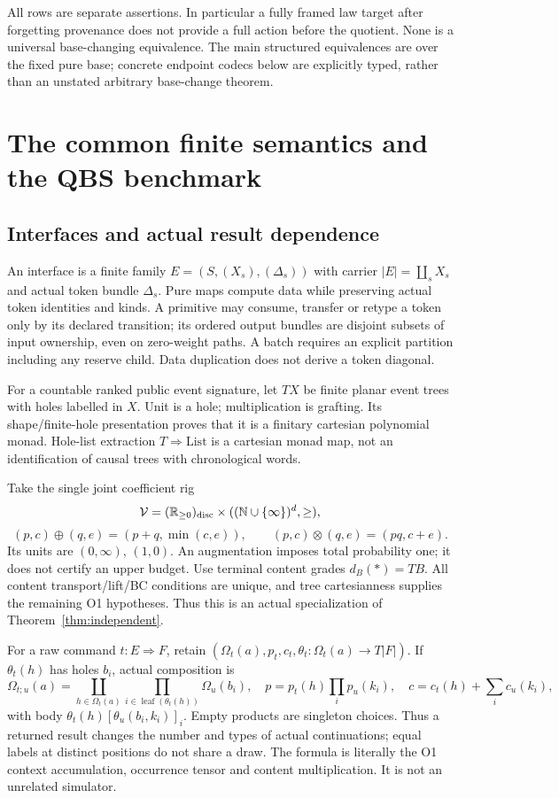 \documentclass[11pt,a4paper]{article}
\theoremstyle{definition}
\newcommand{\V}{\mathcal V}
\newcommand{\leaf}{\operatorname{leaf}}
\begin{document}
All rows are separate assertions. In particular a fully framed law target
after forgetting provenance does not provide a full action before the
quotient. None is a universal base-changing equivalence. The main
structured equivalences are over the fixed pure base; concrete endpoint
codecs below are explicitly typed, rather than an unstated arbitrary
base-change theorem.

\section{The common finite semantics and the QBS benchmark}\label{sec:semantics}

\subsection{Interfaces and actual result dependence}
An interface is a finite family \(E=(S,(X_s),(\Delta_s))\) with carrier
\(|E|=\coprod_sX_s\) and actual token bundle \(\Delta_s\). Pure maps
compute data while preserving actual token identities and kinds. A primitive
may consume, transfer or retype a token only by its declared transition;
its ordered output bundles are disjoint subsets of input ownership, even
on zero-weight paths. A batch requires an explicit partition including
any reserve child. Data duplication does not derive a token diagonal.

For a countable ranked public event signature, let \(TX\) be finite
planar event trees with holes labelled in \(X\). Unit is a hole;
multiplication is grafting. Its shape/finite-hole presentation proves
that it is a finitary cartesian polynomial monad. Hole-list extraction
\(T\Rightarrow\mathrm{List}\) is a cartesian monad map, not an
identification of causal trees with chronological words.

Take the single joint coefficient rig
\[
 \V=(\mathbb R_{\ge0})_{\rm disc}\times
           ((\mathbb N\cup\{\infty\})^d,\ge),
\]
\[
 (p,c)\oplus(q,e)=(p+q,\min(c,e)),\qquad
 (p,c)\otimes(q,e)=(pq,c+e).
\]
Its units are \((0,\infty)\), \((1,0)\). An augmentation imposes total
probability one; it does not certify an upper budget. Use terminal content
grades \(d_B(*)=TB\). All content transport/lift/BC conditions are unique,
and tree cartesianness supplies the remaining O1 hypotheses. Thus this is
an actual specialization of Theorem~\ref{thm:independent}.

For a raw command \(t:E\Rightarrow F\), retain
\((\Omega_t(a),p_t,c_t,\theta_t:\Omega_t(a)\to T|F|)\).
If \(\theta_t(h)\) has holes \(b_i\), actual composition is
\begin{equation}\label{eq:occurrence}
 \Omega_{t;u}(a)=\coprod_{h\in\Omega_t(a)}\prod_{i\in\leaf(\theta_t(h))}
                         \Omega_u(b_i),\quad
 p=p_t(h)\prod_i p_u(k_i),\quad c=c_t(h)+\sum_i c_u(k_i),
\end{equation}
with body \(\theta_t(h)[\theta_u(b_i,k_i)]_i\). Empty products are
singleton choices. Thus a returned result changes the number and types of
actual continuations; equal labels at distinct positions do not share a draw.
The formula is literally the O1 context accumulation, occurrence tensor
and content multiplication. It is not an unrelated simulator.
\end{document}
